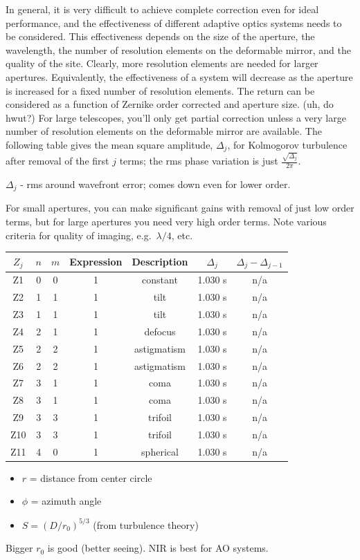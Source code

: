 \documentclass[12pt]{article}
\newcommand{\mynotes}[1]{\textcolor{myBlue}{#1}}
\begin{document}
In general, it is very difficult to achieve complete correction even for ideal
performance, and the effectiveness of different adaptive optics systems needs
to be considered.  This effectiveness depends on the size of the aperture, the
wavelength, the number of resolution elements on the deformable mirror, and the
quality of the site.  Clearly, more resolution elements are needed for larger
apertures.  Equivalently, the effectiveness of a system will decrease as the
aperture is increased for a fixed number of resolution elements.  The return
can be considered as a function of Zernike order corrected and aperture size.
(\mynotes{uh, do hwut?}) For large telescopes, you'll only get
partial correction unless a very large number of resolution elements on the
deformable mirror are available. The following table gives the mean square
amplitude, $\Delta_{j}$, for Kolmogorov turbulence after removal of the first
$j$ terms; the rms phase variation is just
$ \frac{\sqrt{\Delta_{j}}}{2\pi} $.

\mynotes{$\Delta_{j}$ - rms around wavefront error; comes down even
for lower order.}

For small apertures, you can make significant gains with removal of just low
order terms, but for large apertures you need very high order terms. Note
various criteria for quality of imaging, e.g.\ $\lambda/4$, etc.
\newpage
\begin{table}[th]
\centering
\begin{tabular}{c c c c c c c}
    $Z_j$ & $n$ & $m$ & Expression & Description &
    $\Delta_j$ & $\Delta_j - \Delta_{j-1}$\\
    \hline\hline
    Z1 & 0 & 0 & 1 & constant & 1.030 s & n/a\\
    Z2 & 1 & 1 & 1 & tilt & 1.030 s & n/a\\
    Z3 & 1 & 1 & 1 & tilt & 1.030 s & n/a\\
    Z4 & 2 & 1 & 1 & defocus & 1.030 s & n/a\\
    Z5 & 2 & 2 & 1 & astigmatism & 1.030 s & n/a\\
    Z6 & 2 & 2 & 1 & astigmatism & 1.030 s & n/a\\
    Z7 & 3 & 1 & 1 & coma & 1.030 s & n/a\\
    Z8 & 3 & 1 & 1 & coma & 1.030 s & n/a\\
    Z9 & 3 & 3 & 1 & trifoil & 1.030 s & n/a\\
    Z10 & 3 & 3 & 1 & trifoil & 1.030 s & n/a\\
    Z11 & 4 & 0 & 1 & spherical & 1.030 s & n/a\\
    \hline
    \end{tabular}
\end{table}
\begin{itemize}
    \item $r$ = distance from center circle
    \item $\phi$ = azimuth angle
    \item $S=(D/r_0)^{5/3}$ \mynotes{(from turbulence theory)}
\end{itemize}
\mynotes{Bigger $r_{0}$ is good (better seeing). NIR is best for
AO systems.}
\end{document}
